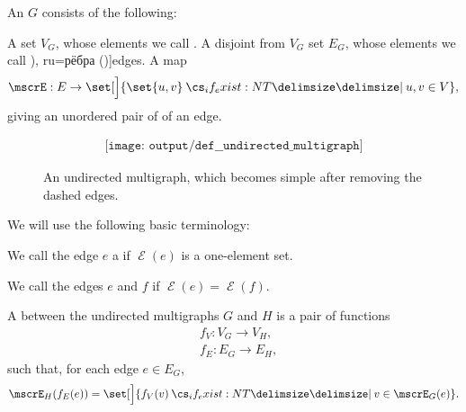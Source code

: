 \begin{definition}\label{def:undirected_multigraph}
  An  \( G \) consists of the following:
  \begin{thmenum}[series=def:undirected_multigraph]
     A set \( V_G \), whose elements we call .
     A disjoint from \( V_G \) set \( E_G \), whose elements we call \term[bg=ребра (\cite[6]{Мирчев2001}), ru=рёбра (\cite[277]{БелоусовТкачёв2004})]{edges}.
     A map
    \begin{equation*}
      \mscrE: E \to \set[\Big]{ \set{ u, v } \given* u, v \in V },
    \end{equation*}
    giving an unordered pair of  of an edge.
  \end{thmenum}

  \begin{figure}[!ht]
    \begin{equation}\label{eq:fig:def:undirected_multigraph}
      \begin{aligned}
        \texttt{[image: output/def\_\_undirected\_multigraph]}
      \end{aligned}
    \end{equation}
    \caption{An undirected multigraph, which becomes simple after removing the dashed edges.}\label{fig:def:undirected_multigraph}
  \end{figure}

  We will use the following basic terminology:
  \begin{thmenum}[resume=def:undirected_multigraph]
     We call the edge \( e \) a  if \( \mscrE(e) \) is a one-element set.

    \medskip

     We call the edges \( e \) and \( f \)  if \( \mscrE(e) = \mscrE(f) \).

    \mimprovised A  between the undirected multigraphs \( G \) and \( H \) is a pair of functions
    \begin{align*}
      &f_V: V_G \to V_H, \\
      &f_E: E_G \to E_H,
    \end{align*}
    such that, for each edge \( e \in E_G \),
    \begin{equation}\label{eq:def:undirected_multigraph/homomorphism}
      \mscrE_H(f_E(e)) = \set[\Big]{ f_V(v) \given* v \in \mscrE_G(e) }.
    \end{equation}


\end{thmenum}
\end{definition}
